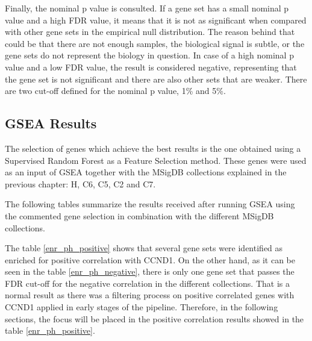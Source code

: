 Finally, the nominal p value is consulted. If a gene set has a small nominal p value and a high FDR value, it means that it is not as significant when compared with other gene sets in the empirical null distribution. The reason behind that could be that there are not enough samples, the biological signal is subtle, or the gene sets do not represent the biology in question.
In case of a high nominal p value and a low FDR value, the result is considered negative, representing that the gene set is not significant and there are also other sets that are weaker.
There are two cut-off defined for the nominal p value, 1\% and 5\%.







\subsection{GSEA Results}

The selection of genes which achieve the best results is the one obtained using a Supervised Random Forest as a Feature Selection method. These genes were used as an input of GSEA together with the MSigDB collections explained in the previous chapter: H, C6, C5, C2 and C7.

The following tables summarize the results received after running GSEA using the commented gene selection in combination with the different MSigDB collections.

The table \ref{enr_ph_positive} shows that several gene sets were identified as enriched for positive correlation with CCND1. On the other hand, as it can be seen in the table \ref{enr_ph_negative}, there is only one gene set that passes the FDR cut-off for the negative correlation in the different collections. That is a normal result as there was a filtering process on positive correlated genes with CCND1 applied in early stages of the pipeline. Therefore, in the following sections, the focus will be placed in the positive correlation results showed in the table \ref{enr_ph_positive}.

